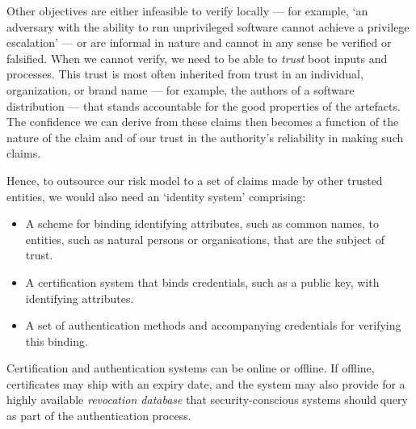 Other objectives are either infeasible to verify locally --- for example, `an adversary with the ability to run unprivileged software cannot achieve a privilege escalation' --- or are informal in nature and cannot in any sense be verified or falsified.
%
When we cannot verify, we need to be able to \emph{trust} boot inputs and processes.
%
This trust is most often inherited from trust in an individual, organization, or brand name --- for example, the authors of a software distribution --- that stands accountable for the good properties of the artefacts.
%
The confidence we can derive from these claims then becomes a function of the nature of the claim and of our trust in the authority's reliability in making such claims.

Hence, to outsource our risk model to a set of claims made by other trusted entities, we would also need an `identity system' comprising:
\begin{itemize}
  \item A scheme for binding identifying attributes, such as common names, to entities, such as natural persons or organisations, that are the subject of trust.
  \item A certification system that binds credentials, such as a public key, with identifying attributes.
  \item A set of authentication methods and accompanying credentials for verifying this binding. 
\end{itemize}
%
Certification and authentication systems can be online or offline.
%
If offline, certificates may ship with an expiry date, and the system may also provide for a highly available \emph{revocation database} that security-conscious systems should query as part of the authentication process.

